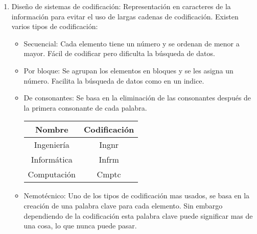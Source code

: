 \documentclass{templateNote}
\begin{document}
\begin{enumerate}
\begin{enumerate}
            \newpage
            \item Diseño de sistemas de codificación: Representación en caracteres de la información para evitar el uso de largas cadenas de codificación.\newline
            Existen varios tipos de codificación:
            \begin{itemize}
                \item Secuencial: Cada elemento tiene un número y se ordenan de menor a mayor. Fácil de codificar pero dificulta la búsqueda de datos.
                \item Por bloque: Se agrupan los elementos en bloques y se les asigna un número. Facilita la búsqueda de datos como en un indice.
                \item De consonantes: Se basa en la eliminación de las consonantes después de la primera consonante de cada palabra.
                \begin{tcolorbox}[colback=green!10!white,colframe=green!75!black,title=Ejemplo de codificación de consonantes]
                    \begin{center}
                        \begin{tabular}{|c|c|}
                            \hline
                            \textbf{Nombre} & \textbf{Codificación} \\ \hline
                            Ingeniería & Ingnr \\ \hline
                            Informática & Infrm \\ \hline
                            Computación & Cmptc \\ \hline
                        \end{tabular}
                    \end{center}
                \end{tcolorbox}
                \item Nemotécnico: Uno de los tipos de codificación mas usados, se basa en la creación de una palabra clave para cada elemento.
                Sin embargo dependiendo de la codificación esta palabra clave puede significar mas de una cosa, lo que nunca puede pasar.
                \begin{tcolorbox}[colback=green!10!white,colframe=green!75!black,title=Ejemplo de codificación Nemotécnica]
                    \begin{center}
                        \begin{tabular}{|c|c|}
                            \hline

\end{tabular}
\end{center}
\end{tcolorbox}
\end{itemize}
\end{enumerate}
\end{enumerate}
\end{document}
